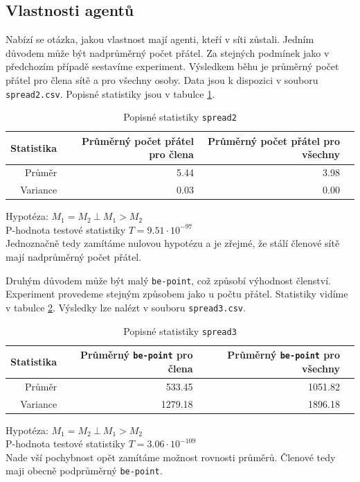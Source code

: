 \documentclass[a4wide,12pt]{report}
\begin{document}
\subsection{Vlastnosti agentů}
Nabízí se otázka, jakou vlastnost mají agenti, kteří v síti zůstali. Jedním důvodem může být nadprůměrný počet přátel. Za stejných podmínek jako v předchozím případě sestavíme experiment. Výsledkem běhu je průměrný počet přátel pro člena sítě a pro všechny osoby. Data jsou k dispozici v souboru \texttt{spread2.csv}. Popisné statistiky jsou v tabulce \ref{tab:spread2_desc}.
\begin{table}[H]
  \begin{center}
  \begin{tabular}{|r|r|r|r|}
  \hline
  Statistika&Průměrný počet přátel pro člena	&Průměrný počet přátel pro všechny\\\hline
  Průměr	&5.44	&3.98\\\hline

  Variance	&0.03	&0.00\\\hline
  \end{tabular}
  \end{center}
  \caption{Popisné statistiky \texttt{spread2}}
  \label{tab:spread2_desc}
\end{table}
Hypotéza: $M_1=M_2 ~ \bot ~ M_1>M_2$\\
P-hodnota testové statistiky $T = 9.51\cdot 10^{-97}$\\
Jednoznačně tedy zamítáme nulovou hypotézu a je zřejmé, že stálí členové sítě mají nadprůměrný počet přátel.

Druhým důvodem může být malý \texttt{be-point}, což způsobí výhodnost členství. Experiment provedeme stejným způsobem jako u počtu přátel. Statistiky vidíme v tabulce \ref{tab:spread3_desc}. Výsledky lze nalézt v souboru \texttt{spread3.csv}.
\begin{table}[H]
  \begin{center}
  \begin{tabular}{|r|r|r|r|}
  \hline
  Statistika&Průměrný \texttt{be-point} pro člena	&Průměrný \texttt{be-point} pro všechny\\\hline
  Průměr	&533.45	&1051.82\\\hline

  Variance	&1279.18	&1896.18\\\hline
  \end{tabular}
  \end{center}
  \caption{Popisné statistiky \texttt{spread3}}
  \label{tab:spread3_desc}
\end{table}
Hypotéza: $M_1=M_2 ~ \bot ~ M_1>M_2$\\
P-hodnota testové statistiky $T = 3.06\cdot 10^{-109}$\\
Nade vší pochybnost opět zamítáme možnost rovnosti průměrů. Členové tedy maji obecně podprůměrný \texttt{be-point}.
\end{document}

